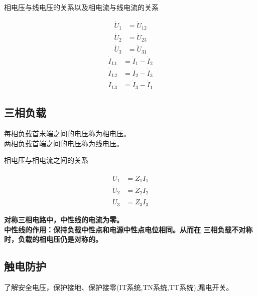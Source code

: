 \noindent 相电压与线电压的关系以及相电流与线电流的关系

\begin{equation}
    \begin{aligned}
        \dot{U}_{1} &= \dot{U}_{12} \\
        \dot{U}_{2} &= \dot{U}_{23} \\
        \dot{U}_{3} &= \dot{U}_{31}
    \end{aligned}
\end{equation}
\begin{equation}
    \begin{aligned}
        \dot{I}_{L1} &= \dot{I}_{1} - \dot{I}_{2} \\
        \dot{I}_{L2} &= \dot{I}_{2} - \dot{I}_{3} \\
        \dot{I}_{L3} &= \dot{I}_{3} - \dot{I}_{1}
    \end{aligned}
\end{equation}



\subsection{三相负载}

\noindent 每相负载首末端之间的电压称为相电压。\\
两相负载首端之间的电压称为线电压。

\noindent 相电压与相电流之间的关系

\begin{equation}
    \begin{aligned}
        \dot{U}_{1} &= \dot{Z}_{1} \dot{I}_{1} \\
        \dot{U}_{2} &= \dot{Z}_{2} \dot{I}_{2} \\
        \dot{U}_{3} &= \dot{Z}_{3} \dot{I}_{3}
    \end{aligned}
\end{equation}

\noindent \textbf{对称三相电路中，中性线的电流为零。\\
中性线的作用：保持负载中性点和电源中性点电位相同。从而在
三相负载不对称时，负载的相电压仍是对称的。}


\subsection{触电防护}

了解安全电压，保护接地、保护接零(IT系统,TN系统,TT系统),漏电开关。
